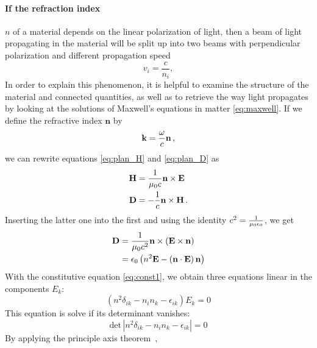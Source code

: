 \paragraph{If the refraction index}
 $n$ of a material depends on the linear polarization of light, 
then a beam of light propagating in the material will be split up into 
two beams with perpendicular polarization and different propagation speed 
\begin{equation}
   v_i = \frac{c}{n_i}, 
\end{equation}
In order to explain this phenomenon, it is helpful to examine the 
structure of the material and connected quantities, as well as 
to retrieve the way light propagates by looking at the solutions 
of Maxwell's equations in matter \eqref{eq:maxwell}.
If we define the 
refractive index $\mathbf{n}$ by 
\begin{equation}
    \mathbf{k} = \frac{\omega}{c} \mathbf{n} \, ,
    \label{eq:def_n}
\end{equation}
we can rewrite equations \eqref{eq:plan_H} and \eqref{eq:plan_D} as 
\begin{subequations}
\begin{align}
    \mathbf{H} &= \frac{1}{\mu_0 c} \mathbf{n} \times \mathbf{E} 
    \label{eq:plan_Hb} \\
    \mathbf{D} &= - \frac{1}{c} \mathbf{n} \times \mathbf{H}
    \label{eq:plan_Db} \, .
\end{align}
\end{subequations}
Inserting the latter one into the first and using 
the identity $c^2 = \frac{1}{\mu_0 \epsilon_0}$, we get 
\begin{equation}
    \begin{split}
    \mathbf{D}  &= \frac{1}{\mu_0 c^2} \mathbf{n} \times \left(\mathbf{E} \times \mathbf{n}\right) \\
        &= \epsilon_0 \left(n^2 \mathbf{E} - \left(\mathbf{n} \cdot \mathbf{E}\right) \mathbf{n} \right)
    \label{eq:D(E)}
    \end{split}
\end{equation}
With the constitutive equation \eqref{eq:const1}, we obtain three 
equations linear in the components $E_k$:
\begin{equation}
    \left(n^2 \delta_{ik} - n_i n_k - \epsilon_{ik}\right) E_k = 0
\end{equation}
This equation is solve if its determinant vanishes:
\begin{equation}
    \mathrm{det}\,\left|n^2 \delta_{ik} - n_i n_k - \epsilon_{ik}\right| = 0
\end{equation}
By applying the principle axis theorem~\cite{strang2003introduction}, 
